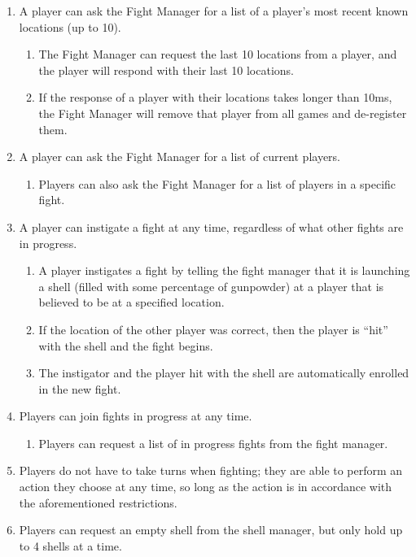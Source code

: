 \documentclass[12pt]{article}
\begin{document}
\begin{enumerate}
	\item{A player can ask the Fight Manager for a list of a player’s most recent known locations (up to 10).}
	\begin{enumerate}
		\item{The Fight Manager can request the last 10 locations from a player, and the player will respond with their last 10 locations.}
		\item{If the response of a player with their locations takes longer than 10ms, the Fight Manager will remove that player from all games and de-register them. }
	\end{enumerate}
	
	\item{A player can ask the Fight Manager for a list of current players.}
	\begin{enumerate}
		\item{Players can also ask the Fight Manager for a list of players in a specific fight.}
	\end{enumerate}
	
	\item{A player can instigate a fight at any time, regardless of what other fights are in progress.}
	\begin{enumerate}
		\item{A player instigates a fight by telling the fight manager that it is launching a shell (filled with some percentage of gunpowder) at a player that is believed to be at a specified location.}
		\item{If the location of the other player was correct, then the player is “hit” with the shell and the fight begins.}
		\item{The instigator and the player hit with the shell are automatically enrolled in the new fight.}
	\end{enumerate}
	
	\item{Players can join fights in progress at any time.}
	\begin{enumerate}
		\item{Players can request a list of in progress fights from the fight manager.}
	\end{enumerate}
	
	\item{Players do not have to take turns when fighting; they are able to perform an action they choose at any time, so long as the action is in accordance with the aforementioned restrictions.}
	
	\item{Players can request an empty shell from the shell manager, but only hold up to 4 shells at a time.}
	

\end{enumerate}
\end{document}
